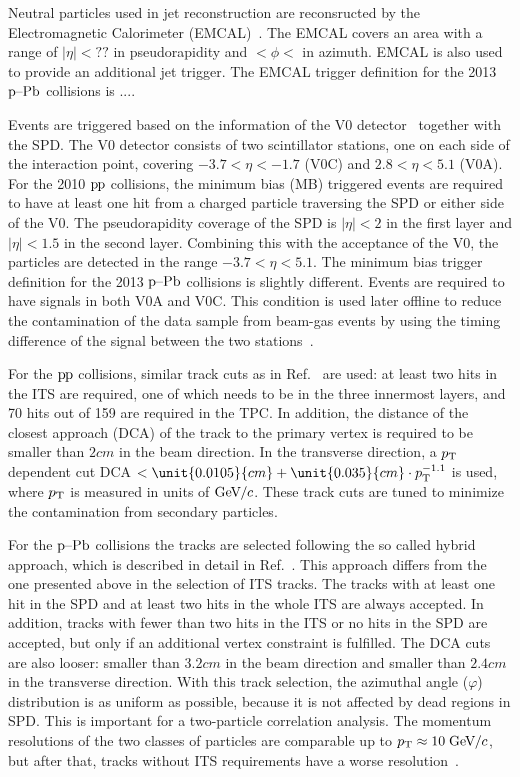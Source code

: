 Neutral particles used in jet reconstruction are reconsructed by the Electromagnetic Calorimeter (EMCAL)~\cite{aliceEMCAL}. The EMCAL covers an area with a range of $|\eta| < ??$  in pseudorapidity and $ < \phi < $ in azimuth. EMCAL is also used to provide an additional jet trigger. The EMCAL trigger definition for the 2013 $\mbox{p--Pb}$ collisions is .... 


Events are triggered based on the information of the V0 detector~\cite{forwarddetectorsTdr} together with the SPD. The V0 detector consists of two scintillator stations, one on each side of the interaction point, covering $-3.7 < \eta < -1.7$ (V0C) and $2.8 < \eta < 5.1$ (V0A). For the 2010 $\mbox{p\kern-0.05em p}$ collisions, the minimum bias (MB) triggered events are required to have at least one hit from a charged particle traversing the SPD or either side of the V0. The pseudorapidity coverage of the SPD is $|\eta| < 2$ in the first layer and $|\eta| < 1.5$ in the second layer. Combining this with the acceptance of the V0, the particles are detected in the range $-3.7 < \eta < 5.1$. The minimum bias trigger definition for the 2013 $\mbox{p--Pb}$ collisions is slightly different. Events are required to have signals in both V0A and V0C. This condition is used later offline to reduce the contamination of the data sample from beam-gas events by using the timing difference of the signal between the two stations~\cite{alicePerformance}.

For the $\mbox{p\kern-0.05em p}$ collisions, similar track cuts as in Ref.~\cite{ALICE:2011ac} are used: at least two hits in the ITS are required, one of which needs to be in the three innermost layers, and 70 hits out of 159 are required in the TPC. In addition, the distance of the closest approach (DCA) of the track to the primary vertex is required to be smaller than $\unit{2}{cm}$ in the beam direction. In the transverse direction, a $p_{\rm T}$ dependent cut DCA $< \unit{0.0105}{cm} + \unit{0.035}{cm} \cdot \pt{}^{-1.1}$ is used, where $p_{\rm T}$ is measured in units of $\mathrm{GeV}\kern-0.05em/\kern-0.02em c$. These track cuts are tuned to minimize the contamination from secondary particles.

For the $\mbox{p--Pb}$ collisions the tracks are selected following the so called hybrid approach, which is described in detail in Ref.~\cite{hybridExplanation}. This approach differs from the one presented above in the selection of ITS tracks. The tracks with at least one hit in the SPD and at least two hits in the whole ITS are always accepted. In addition, tracks with fewer than two hits in the ITS or no hits in the SPD are accepted, but only if an additional vertex constraint is fulfilled. The DCA cuts are also looser: smaller than $\unit{3.2}{cm}$ in the beam direction and smaller than $\unit{2.4}{cm}$ in the transverse direction. With this track selection, the azimuthal angle ($\varphi$) distribution is as uniform as possible, because it is not affected by dead regions in SPD. This is important for a two-particle correlation analysis. The momentum resolutions of the two classes of particles are comparable up to $p_{\rm T} \approx 10\;\mathrm{GeV}\kern-0.05em/\kern-0.02em c$, but after that, tracks without ITS requirements have a worse resolution~\cite{alicePerformance,aliceBackgroundFluctuation}.

